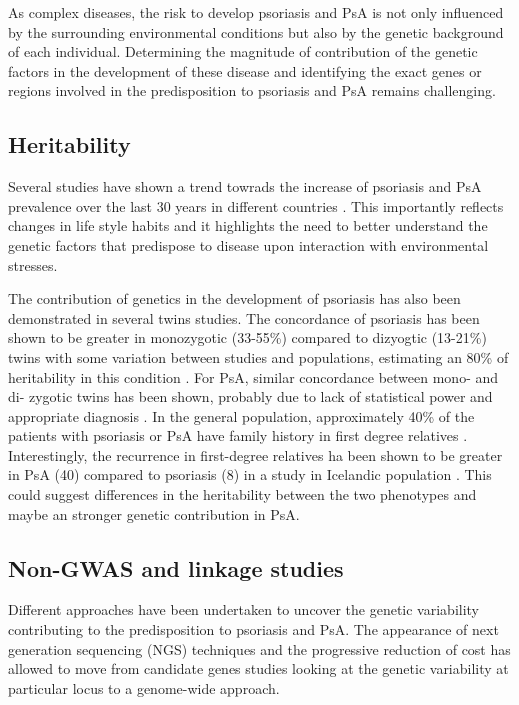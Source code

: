 As complex diseases, the risk to develop psoriasis and PsA is not only influenced by the surrounding environmental conditions but also by the genetic background of each individual. Determining the magnitude of contribution of the genetic factors in the development of these disease and identifying the exact genes or regions involved in the predisposition to psoriasis and PsA remains challenging. 


\subsection{Heritability}

Several studies have shown a trend towrads the increase of psoriasis and PsA prevalence over the last 30 years in different countries \parencite{Organization2016}. This importantly reflects changes in life style habits and it highlights the need to better understand the genetic factors that predispose to disease upon interaction with environmental stresses.

The contribution of genetics in the development of psoriasis has also been demonstrated in several twins studies. The concordance of psoriasis has been shown to be greater in monozygotic (33-55\%) compared to dizyogtic (13-21\%) twins with some variation between studies and populations, estimating an 80\% of heritability in this condition \parencite{Faber1974, Duffy1993, Pendersen2008}. For PsA, similar concordance between mono- and di- zygotic twins has been shown, probably due to lack of statistical power and appropriate diagnosis \parencite{Pendersen2008}. In the general population, approximately 40\% of the patients with psoriasis or PsA have family history in first degree relatives \parencite{Gladman1986}. Interestingly, the recurrence in first-degree relatives ha been shown to be greater in PsA (40) compared to psoriasis (8) in a study in Icelandic population \parencite{Chandran2009}. This could suggest differences in the heritability between the two phenotypes and maybe an stronger genetic contribution in PsA.

\subsection{Non-GWAS and linkage studies}
Different approaches have been undertaken to uncover the genetic variability contributing to the predisposition to psoriasis and PsA. The appearance of next generation sequencing (NGS) techniques and the progressive reduction of cost has allowed to move from candidate genes studies looking at the genetic variability at particular locus to a genome-wide approach.

